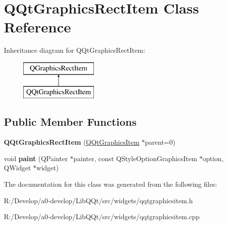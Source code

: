 \hypertarget{class_q_qt_graphics_rect_item}{}\section{Q\+Qt\+Graphics\+Rect\+Item Class Reference}
\label{class_q_qt_graphics_rect_item}
Inheritance diagram for Q\+Qt\+Graphics\+Rect\+Item\+:\begin{figure}[H]
\begin{center}
\leavevmode
\includegraphics[height=2.000000cm]{class_q_qt_graphics_rect_item}
\end{center}
\end{figure}
\subsection*{Public Member Functions}
\begin{DoxyCompactItemize}
\item 
\mbox{\label{class_q_qt_graphics_rect_item_a5df88f435863e17e2dddaedefb1c45ad}} 
{\bfseries Q\+Qt\+Graphics\+Rect\+Item} (\mbox{\hyperlink{class_q_qt_graphics_item}{Q\+Qt\+Graphics\+Item}} $\ast$parent=0)
\item 
\mbox{\label{class_q_qt_graphics_rect_item_a259d02c2b5241626e7e1f12495369e84}} 
void {\bfseries paint} (Q\+Painter $\ast$painter, const Q\+Style\+Option\+Graphics\+Item $\ast$option, Q\+Widget $\ast$widget)
\end{DoxyCompactItemize}


The documentation for this class was generated from the following files\+:\begin{DoxyCompactItemize}
\item 
R\+:/\+Develop/a0-\/develop/\+Lib\+Q\+Qt/src/widgets/qqtgraphicsitem.\+h\item 
R\+:/\+Develop/a0-\/develop/\+Lib\+Q\+Qt/src/widgets/qqtgraphicsitem.\+cpp\end{DoxyCompactItemize}
